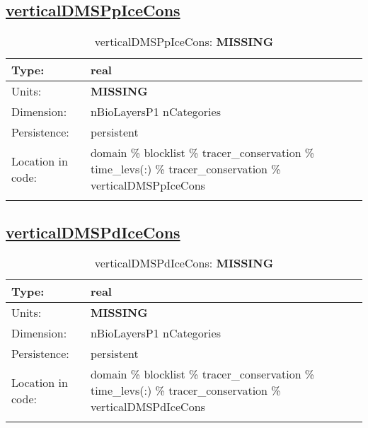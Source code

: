 \subsection[verticalDMSPpIceCons]{\hyperref[sec:var_tab_tracer_conservation]{verticalDMSPpIceCons}}
\label{subsec:var_sec_tracer_conservation_verticalDMSPpIceCons}
\begin{center}
\begin{longtable}{| p{2.0in} | p{4.0in} |}
        \hline 
        Type: & real \\
        \hline 
        Units: & {\bf \color{red} MISSING} \\
        \hline 
        Dimension: & nBioLayersP1 nCategories \\
        \hline 
        Persistence: & persistent \\
        \hline 
         Location in code: & domain \% blocklist \% tracer\_conservation \% time\_levs(:) \% tracer\_conservation \% verticalDMSPpIceCons \\
         \hline 
    \caption{verticalDMSPpIceCons: {\bf \color{red} MISSING}}
\end{longtable}
\end{center}
\subsection[verticalDMSPdIceCons]{\hyperref[sec:var_tab_tracer_conservation]{verticalDMSPdIceCons}}
\label{subsec:var_sec_tracer_conservation_verticalDMSPdIceCons}
\begin{center}
\begin{longtable}{| p{2.0in} | p{4.0in} |}
        \hline 
        Type: & real \\
        \hline 
        Units: & {\bf \color{red} MISSING} \\
        \hline 
        Dimension: & nBioLayersP1 nCategories \\
        \hline 
        Persistence: & persistent \\
        \hline 
         Location in code: & domain \% blocklist \% tracer\_conservation \% time\_levs(:) \% tracer\_conservation \% verticalDMSPdIceCons \\
         \hline 
    \caption{verticalDMSPdIceCons: {\bf \color{red} MISSING}}
\end{longtable}
\end{center}
